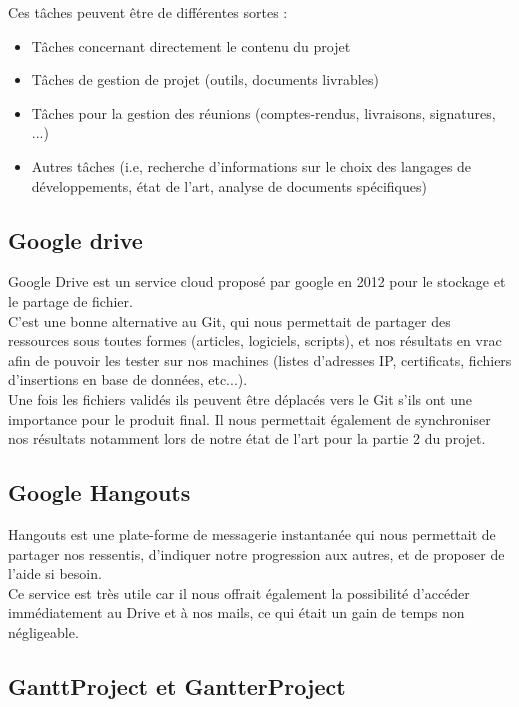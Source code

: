 Ces tâches peuvent être de différentes sortes :
\begin{itemize}
\item Tâches concernant directement le contenu du projet
\item Tâches de gestion de projet (outils, documents livrables)
\item Tâches pour la gestion des réunions (comptes-rendus, livraisons, signatures, ...)
\item Autres tâches (i.e, recherche d'informations sur le choix des langages de développements, état de l'art, analyse de documents spécifiques)
\end{itemize}

\subsection{Google drive}

Google Drive est un service cloud proposé par google en 2012 pour le stockage et le partage de fichier.\\
C'est une bonne alternative au Git, qui nous permettait de partager des ressources sous toutes formes (articles, logiciels, scripts), et nos résultats en vrac afin de pouvoir les tester sur nos machines (listes d'adresses IP, certificats, fichiers d'insertions en base de données, etc...).\\
Une fois les fichiers validés ils peuvent être déplacés vers le Git s'ils ont une importance pour le produit final. Il nous permettait également de synchroniser nos résultats notamment lors de notre état de l'art pour la partie 2 du projet.

\subsection{Google Hangouts}

Hangouts est une plate-forme de messagerie instantanée qui nous permettait de partager nos ressentis, d'indiquer notre progression aux autres, et de proposer de l'aide si besoin.\\
Ce service est très utile car il nous offrait également la possibilité d'accéder immédiatement au Drive et à nos mails, ce qui était un gain de temps non négligeable.

\subsection{GanttProject et GantterProject}

